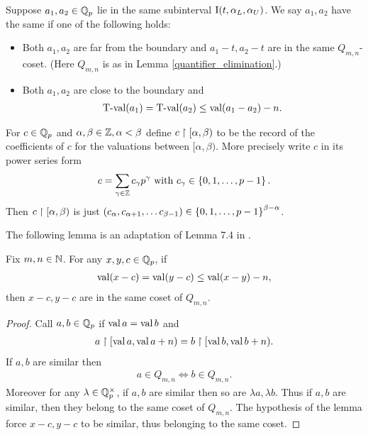 \begin{Definition}
  Suppose $a_1, a_2 \in \mathbb{Q}_p$ lie in the same subinterval $\operatorname{I}(t, \alpha_L, \alpha_U)$.
  We say $a_1, a_2$ have the same  if one of the following holds:
  \begin{itemize}
  \item Both $a_1, a_2$ are far from the boundary and $a_1 - t, a_2 - t$ are in the same $Q_{m,n}$-coset.
    (Here $Q_{m,n}$ is as in Lemma \ref{quantifier_elimination}.)
  \item Both $a_1, a_2$ are close to the boundary and 
    \begin{align*}
	  \operatorname{T-val}(a_1) = \operatorname{T-val}(a_2) \leq \operatorname{val}(a_1 - a_2) - n.
    \end{align*}
  \end{itemize}      
\end{Definition}


\begin{Definition}
	For $c \in \mathbb{Q}_p$ and $\alpha, \beta \in \mathbb{Z}, \alpha < \beta$ define $c \upharpoonright [\alpha, \beta)$
  to be the record of the coefficients of $c$ for the valuations between $[\alpha, \beta)$.
  More precisely write $c$ in its power series form
  \begin{align*}
    c = \sum_{\gamma \in \mathbb{Z}} c_\gamma p^\gamma \text{ with } c_\gamma \in \left\{0,1, \ldots, p-1\right\}.
  \end{align*}
  Then $c \upharpoonright [\alpha, \beta)$ is just $(c_\alpha, c_{\alpha+1}, \ldots c_{\beta - 1}) \in \left\{0,1, \ldots, p-1\right\}^{\beta - \alpha}$.
\end{Definition}

The following lemma is an adaptation of Lemma 7.4 in \cite{density}.
\begin{Lemma} \label{distance}
  Fix $m,n \in \mathbb{N}$.
  For any $x,y,c \in \mathbb{Q}_p$, if
  \begin{align*}
    \operatorname{val} (x - c) = \operatorname{val} (y - c) \leq \operatorname{val} (x - y) - n,
  \end{align*}
  then $x - c, y - c$ are in the same coset of $Q_{m,n}$.
\end{Lemma}
\begin{proof}
  Call $a,b \in \mathbb{Q}_p$  if $\operatorname{val} a = \operatorname{val} b$ and
  \begin{align*}
    a \upharpoonright [\operatorname{val} a, \operatorname{val} a + n) = b \upharpoonright [\operatorname{val} b, \operatorname{val} b + n).
  \end{align*}
  If $a,b$ are similar then
  \begin{align*}
    a \in Q_{m,n} \iff b \in Q_{m,n}.
  \end{align*}
  Moreover for any $\lambda \in \mathbb{Q}_p^\times$, if $a,b$ are similar then so are $\lambda a, \lambda b$.
  Thus if $a,b$ are similar, then they belong to the same coset of $Q_{m,n}$.
  The hypothesis of the lemma force $x - c, y - c$ to be similar, thus belonging to the same coset.
\end{proof} 


